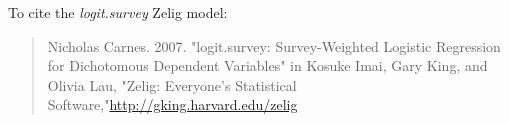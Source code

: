 To cite the \emph{ logit.survey } Zelig model:
 \begin{verse}
 Nicholas Carnes. 2007. "logit.survey: Survey-Weighted Logistic Regression for Dichotomous Dependent Variables" in Kosuke Imai, Gary King, and Olivia Lau, "Zelig: Everyone's Statistical Software,"\url{http://gking.harvard.edu/zelig} 
\end{verse}